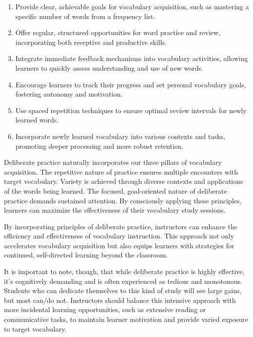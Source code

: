 \begin{enumerate}
    \item Provide clear, achievable goals for vocabulary acquisition, such as mastering a specific number of words from a frequency list.
    
    \item Offer regular, structured opportunities for word practice and review, incorporating both receptive and productive skills.
    
    \item Integrate immediate feedback mechanisms into vocabulary activities, allowing learners to quickly assess understanding and use of new words.
    
    \item Encourage learners to track their progress and set personal vocabulary goals, fostering autonomy and motivation.
    
    \item Use spaced repetition techniques to ensure optimal review intervals for newly learned words.
    
    \item Incorporate newly learned vocabulary into various contexts and tasks, promoting deeper processing and more robust retention.
\end{enumerate}

Deliberate practice naturally incorporates our three pillars of vocabulary acquisition. The repetitive nature of practice ensures multiple encounters with target vocabulary. Variety is achieved through diverse contexts and applications of the words being learned. The focused, goal-oriented nature of deliberate practice demands sustained attention. By consciously applying these principles, learners can maximize the effectiveness of their vocabulary study sessions.

By incorporating principles of deliberate practice, instructors can enhance the efficiency and effectiveness of vocabulary instruction. This approach not only accelerates vocabulary acquisition but also equips learners with strategies for continued, self-directed learning beyond the classroom.

It is important to note, though, that while deliberate practice is highly effective, it's cognitively demanding and is often experienced as tedious and monotonous. Students who can dedicate themselves to this kind of study will see large gains, but most can/do not. Instructors should balance this intensive approach with more incidental learning opportunities, such as extensive reading or communicative tasks, to maintain learner motivation and provide varied exposure to target vocabulary.


